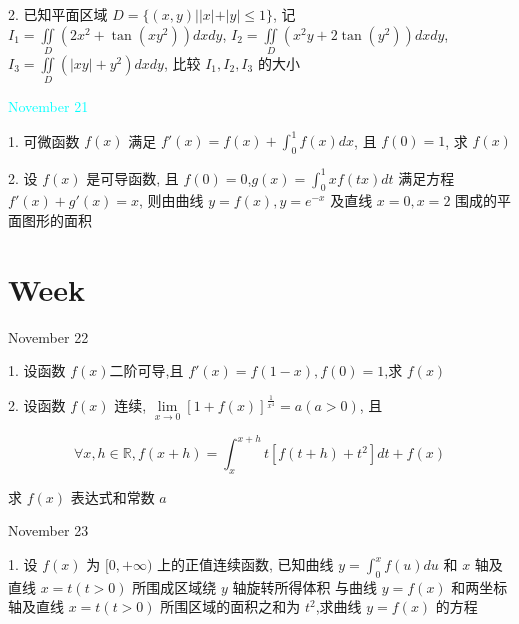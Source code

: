 2. 已知平面区域 $D=\{(x,y)||x|+|y|\leq 1\}$,
记 $\displaystyle{I_{1}=\iint\limits_{D}(2x^{2}+\tan(xy^2))dxdy}$,
$\displaystyle{I_{2}=\iint\limits_{D}(x^{2}y+2\tan(y^2))dxdy}$,
$\displaystyle{I_{3}=\iint\limits_{D}(|xy|+y^2)dxdy}$, 比较 $I_{1},I_{2},I_{3}$ 的大小
\begin{solution}
	
\end{solution}

\textcolor{cyan}{November 21}

1. 可微函数 $f(x)$ 满足 $f'(x)=f(x)+\int_{0}^{1}f(x)dx$, 且 $f(0)=1$, 求 $f(x)$
\begin{solution}
	
\end{solution}

2. 设 $f(x)$ 是可导函数, 且 $f(0)=0$,$g(x)=\int_{0}^{1}xf(tx)dt$ 满足方程 $f'(x)+g'(x)=x$,
则由曲线 $y=f(x),y=e^{-x}$ 及直线 $x=0,x=2$ 围成的平面图形的面积
\begin{solution}
	
\end{solution}

\section{Week }
\textcolor{purplea}{November 22}

1. 设函数 $f(x)$二阶可导,且 $f'(x)=f(1-x),f(0)=1$,求 $f(x)$
\begin{solution}
	
\end{solution}

2. 设函数 $f(x)$ 连续, $\lim\limits_{x\to 0 }\left[ 1+f(x)\right]^{\frac{1}{x^4}}=a(a>0)$, 且

$$\forall x,h \in \mathbb{R},f(x+h)=\int_{x}^{x+h}t\left[f(t+h)+t^2 \right]dt+f(x)$$

求 $f(x)$ 表达式和常数 $a$
\begin{solution}
	
\end{solution}

\textcolor{purplea}{November 23}

1. 设 $f(x)$ 为 $[0,+\infty)$ 上的正值连续函数,
已知曲线 $y=\int_{0}^{x}f(u)du$ 和 $x$ 轴及直线 $x=t(t>0)$ 所围成区域绕 $y$ 轴旋转所得体积
与曲线 $y=f(x)$ 和两坐标轴及直线 $x=t(t>0)$ 所围区域的面积之和为 $t^2$,求曲线 $y=f(x)$ 的方程
\begin{solution}
	
\end{solution}

